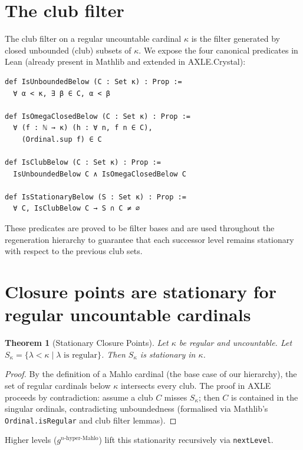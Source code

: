 \documentclass[19pt]{book}
\theoremstyle{plain}
\newtheorem{theorem}{Theorem}[section]
\theoremstyle{definition}
\theoremstyle{remark}
\begin{document}
\section{The club filter}

The club filter on a regular uncountable cardinal \(\kappa\) is the filter generated by closed unbounded (club) subsets of \(\kappa\). We expose the four canonical predicates in Lean (already present in Mathlib and extended in AXLE.Crystal):

\begin{lstlisting}[language=Lean]
def IsUnboundedBelow (C : Set κ) : Prop :=
  ∀ α < κ, ∃ β ∈ C, α < β

def IsOmegaClosedBelow (C : Set κ) : Prop :=
  ∀ (f : ℕ → κ) (h : ∀ n, f n ∈ C),
    (Ordinal.sup f) ∈ C

def IsClubBelow (C : Set κ) : Prop :=
  IsUnboundedBelow C ∧ IsOmegaClosedBelow C

def IsStationaryBelow (S : Set κ) : Prop :=
  ∀ C, IsClubBelow C → S ∩ C ≠ ∅
\end{lstlisting}

These predicates are proved to be filter bases and are used throughout the regeneration hierarchy to guarantee that each successor level remains stationary with respect to the previous club sets.

\section{Closure points are stationary for regular uncountable cardinals}

\begin{theorem}[Stationary Closure Points]
Let \(\kappa\) be regular and uncountable. Let \(S_\kappa = \{\lambda < \kappa \mid \lambda \text{ is regular}\}\). Then \(S_\kappa\) is stationary in \(\kappa\).
\end{theorem}
\begin{proof}
By the definition of a Mahlo cardinal (the base case of our hierarchy), the set of regular cardinals below \(\kappa\) intersects every club. The proof in AXLE proceeds by contradiction: assume a club \(C\) misses \(S_\kappa\); then \(C\) is contained in the singular ordinals, contradicting unboundedness (formalised via Mathlib’s \texttt{Ordinal.isRegular} and club filter lemmas).
\end{proof}

Higher levels (\(g^{n\text{-hyper-Mahlo}}\)) lift this stationarity recursively via \texttt{nextLevel}.
\end{document}
